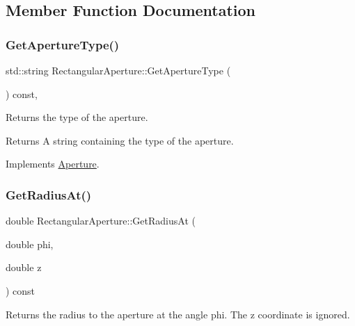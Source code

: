 \subsection{Member Function Documentation}
\mbox{\label{classRectangularAperture_ac7d8e273423b18e1898286a51e3f22c7}} 
\subsubsection{\texorpdfstring{Get\+Aperture\+Type()}{GetApertureType()}}
{\footnotesize\ttfamily std\+::string Rectangular\+Aperture\+::\+Get\+Aperture\+Type (\begin{DoxyParamCaption}{ }\end{DoxyParamCaption}) const\hspace{0.3cm}{\ttfamily [inline]}, {\ttfamily [virtual]}}

Returns the type of the aperture. \begin{DoxyReturn}{Returns}
A string containing the type of the aperture. 
\end{DoxyReturn}


Implements \hyperlink{classAperture_ad7af612271a0586feea83c38549dfb75}{Aperture}.

\mbox{\label{classRectangularAperture_a7ef1ddd66a755305b7bab2a2c3ac5d58}} 
\subsubsection{\texorpdfstring{Get\+Radius\+At()}{GetRadiusAt()}}
{\footnotesize\ttfamily double Rectangular\+Aperture\+::\+Get\+Radius\+At (\begin{DoxyParamCaption}\item[{double}]{phi,  }\item[{double}]{z }\end{DoxyParamCaption}) const\hspace{0.3cm}{\ttfamily [virtual]}}

Returns the radius to the aperture at the angle phi. The z coordinate is ignored.

